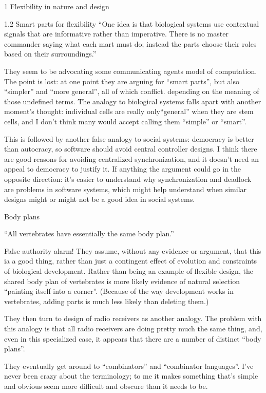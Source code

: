 \documentclass[11pt]{PalisadesLakesBook}
\begin{document}
\begin{plSection}{}
\begin{plSection}{1 Flexibility in nature and design}
\begin{plSection}{1.2 Smart parts for flexibility}
``One idea is that biological systems use contextual signals
that are informative rather than imperative.
There is no master commander saying what each mart must do;
instead the parts choose their roles based on their surroundings.''

They seem to be advocating some communicating agents model
of computation.
The point is lost: at one point they are arguing for
``smart parts'', but also ``simpler'' and ``more general'',
all of which conflict. depending on the meaning of those
undefined terms. 
The analogy to biological systems falls apart with another
moment's thought: 
individual cells are really only``general''
when they are stem cells,
and I don't think many would accept calling them ``simple''
or ``smart''.

This is followed by another false analogy to social systems:
democracy is better than autocracy, 
so software should avoid central controller designs.
I think there are good reasons for avoiding 
centralized synchronization,
and it doesn't need an appeal to democracy to justify it.
If anything the argument could go in the opposite direction:
it's easier to understand why synchronization and deadlock
are problems in software systems, 
which might help understand when similar designs 
might or might not be a good idea in social systems.
 
\begin{plSection}{Body plans}

``All vertebrates have essentially the same body plan.''

False authority alarm! 
They assume, without any evidence or argument,
that this ia a good thing, 
rather than just a contingent effect of 
evolution and constraints of biological development.
Rather than being an example of flexible design,
the shared body plan of vertebrates
is more likely evidence of natural selection
``painting itself into a corner''.
(Because of the way development works in vertebrates,
adding parts is much less likely than deleting them.)

They then turn to design of radio receivers as another analogy.
The problem with this analogy is that all radio receivers
are doing pretty much the same thing,
and, even in this specialized case, 
it appears that there are a number of distinct ``body plans''.

They eventually get around to ``combinators''
and ``combinator languages''.
I've never been crazy about the terminology;
to me it makes something that's simple and obvious 
seem more difficult
and obscure than it needs to be.


\end{plSection}
\end{plSection}
\end{plSection}
\end{plSection}
\end{document}
